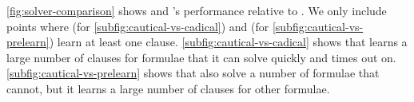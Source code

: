 \autoref{fig:solver-comparison} shows \tool and \cadical's performance relative
to \cadical. We only include points where \tool (for
\autoref{subfig:cautical-vs-cadical}) and \prelearn (for
\autoref{subfig:cautical-vs-prelearn}) learn at least one \pr clause.
\autoref{subfig:cautical-vs-cadical} shows that \tool learns a large number of
\pr clauses for formulae that it can solve quickly and \cadical times out on.
\autoref{subfig:cautical-vs-prelearn} shows that \prelearn also solve a number
of formulae that \tool cannot, but it learns a large number of \pr clauses for
other formulae.











